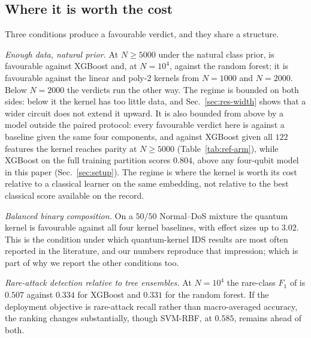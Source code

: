 \subsection{Where it is worth the cost}
\begin{revbody}

Three conditions produce a favourable verdict, and they share a structure.

\emph{Enough data, natural prior.} At $N\geq5000$ under the natural class prior,
\QSVM{} is favourable against XGBoost and, at $N=10^{4}$, against the random
forest; it is favourable against the linear and poly-2 kernels from $N=1000$ and
$N=2000$. Below $N=2000$ the verdicts run the other way. The regime is bounded
on both sides: below it the kernel has too little data, and
Sec.~\ref{sec:res-width} shows that a wider circuit does not extend it upward.
It is also bounded from above by a model outside the paired protocol: every
favourable verdict here is against a baseline given the same four components,
and against XGBoost given all $122$ features the kernel reaches parity at
$N\geq5000$ (Table~\ref{tab:ref-arm}), while XGBoost on the full training
partition scores $0.804$, above any four-qubit model in this paper
(Sec.~\ref{sec:setup}). The regime is where the kernel is worth its cost
relative to a classical learner on the same embedding, not relative to the best
classical score available on the record.

\emph{Balanced binary composition.} On a $50/50$ Normal--DoS mixture the quantum
kernel is favourable against all four kernel baselines, with effect sizes up to
$3.02$. This is the condition under which quantum-kernel IDS results are most
often reported in the literature, and our numbers reproduce that impression;
which is part of why we report the other conditions too.

\emph{Rare-attack detection relative to tree ensembles.} At $N=10^{4}$ the
rare-class $F_{1}$ of \QSVM{} is $0.507$ against $0.334$ for XGBoost and $0.331$
for the random forest. If the deployment objective is rare-attack recall rather
than macro-averaged accuracy, the ranking changes substantially, though
SVM-RBF, at $0.585$, remains ahead of both.
\end{revbody}

